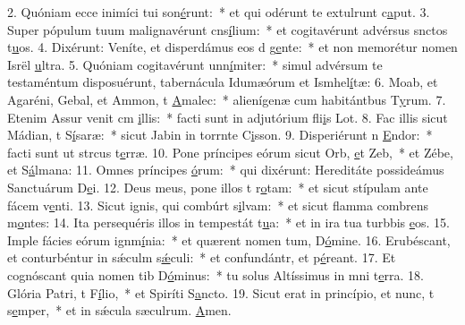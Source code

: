 2. Quóniam ecce inimíci tui son\uline{é}runt:~* et qui odérunt te extulrunt c\uline{a}put.
3. Super pópulum tuum malignavérunt cns\uline{í}lium:~* et cogitavérunt advérsus snctos t\uline{u}os.
4. Dixérunt: Veníte, et disperdámus eos d g\uline{e}nte:~* et non memorétur nomen Isrël \uline{u}ltra.
5. Quóniam cogitavérunt unn\uline{í}miter:~* simul advérsum te testaméntum disposuérunt, tabernácula Idumæórum et Ismhel\uline{í}tæ:
6. Moab, et Agaréni, Gebal, et Ammon, t \uline{A}malec:~* alienígenæ cum habitántbus T\uline{y}rum.
7. Etenim Assur venit cm \uline{i}llis:~* facti sunt in adjutórium fli\uline{i}s Lot.
8. Fac illis sicut Mádian, t S\uline{í}saræ:~* sicut Jabin in torrnte C\uline{i}sson.
9. Disperiérunt n \uline{E}ndor:~* facti sunt ut strcus t\uline{e}rræ.
10. Pone príncipes eórum sicut Orb, \uline{e}t Zeb,~* et Zébe, et S\uline{á}lmana:
11. Omnes príncipes \uline{ó}rum:~* qui dixérunt: Hereditáte possideámus Sanctuárum D\uline{e}i.
12. Deus meus, pone illos t r\uline{o}tam:~* et sicut stípulam ante fácem v\uline{e}nti.
13. Sicut ignis, qui combúrt s\uline{i}lvam:~* et sicut flamma combrens m\uline{o}ntes:
14. Ita persequéris illos in tempestát t\uline{u}a:~* et in ira tua turbbis \uline{e}os.
15. Imple fácies eórum ignm\uline{í}nia:~* et quærent nomen tum, D\uline{ó}mine.
16. Erubéscant, et conturbéntur in sǽculm s\uline{ǽ}culi:~* et confundántr, et p\uline{é}reant.
17. Et cognóscant quia nomen tib D\uline{ó}minus:~* tu solus Altíssimus in mni t\uline{e}rra.
18. Glória Patri, t F\uline{í}lio,~* et Spiríti S\uline{a}ncto.
19. Sicut erat in princípio, et nunc, t s\uline{e}mper,~* et in sǽcula sæculrum. \uline{A}men.
